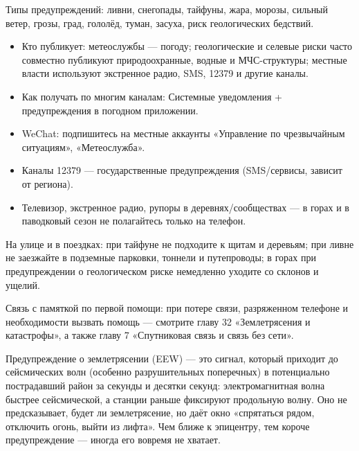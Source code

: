 Типы предупреждений: ливни, снегопады, тайфуны, жара, морозы, сильный ветер, грозы, град, гололёд, туман, засуха, риск геологических бедствий.


\begin{itemize}
  \item Кто публикует: метеослужбы — погоду; геологические и селевые риски часто совместно публикуют природоохранные, водные и МЧС-структуры; местные власти используют экстренное радио, SMS, 12379 и другие каналы.
  \item Как получать по многим каналам: Системные уведомления + предупреждения в погодном приложении.
  \item WeChat: подпишитесь на местные аккаунты «Управление по чрезвычайным ситуациям», «Метеослужба».
  \item Каналы 12379 — государственные предупреждения (SMS/сервисы, зависит от региона).
  \item Телевизор, экстренное радио, рупоры в деревнях/сообществах — в горах и в паводковый сезон не полагайтесь только на телефон.
\end{itemize}

На улице и в поездках: при тайфуне не подходите к щитам и деревьям; при ливне не заезжайте в подземные парковки, тоннели и путепроводы; в горах при предупреждении о геологическом риске немедленно уходите со склонов и ущелий.

Связь с памяткой по первой помощи: при потере связи, разряженном телефоне и необходимости вызвать помощь — смотрите главу 32 «Землетрясения и катастрофы», а также главу 7 «Спутниковая связь и связь без сети».


Предупреждение о землетрясении (EEW) — это сигнал, который приходит до сейсмических волн (особенно разрушительных поперечных) в потенциально пострадавший район за секунды и десятки секунд: электромагнитная волна быстрее сейсмической, а станции раньше фиксируют продольную волну. Оно не предсказывает, будет ли землетрясение, но даёт окно «спрятаться рядом, отключить огонь, выйти из лифта». Чем ближе к эпицентру, тем короче предупреждение — иногда его вовремя не хватает.

